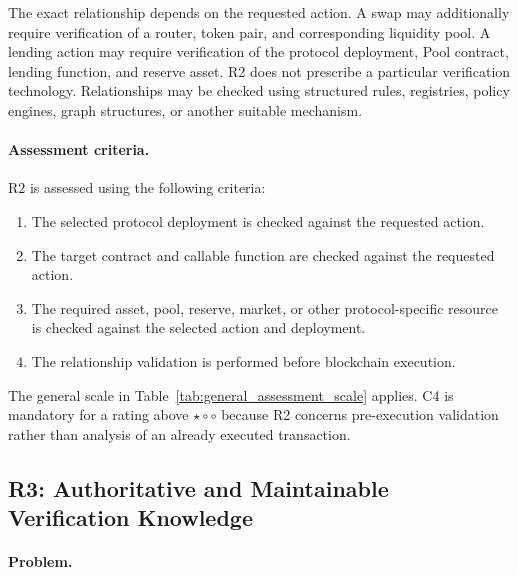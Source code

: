 The exact relationship depends on the requested action. A swap may additionally
require verification of a router, token pair, and corresponding liquidity pool.
A lending action may require verification of the protocol deployment, Pool
contract, lending function, and reserve asset. R2 does not prescribe a particular verification technology. Relationships may
be checked using structured rules, registries, policy engines, graph structures,
or another suitable mechanism.

\paragraph{Assessment criteria.}

R2 is assessed using the following criteria:

\begin{enumerate}
    \item[\textbf{C1}] The selected protocol deployment is checked against
    the requested action.

    \item[\textbf{C2}] The target contract and callable function are checked
    against the requested action.

    \item[\textbf{C3}] The required asset, pool, reserve, market, or other
    protocol-specific resource is checked against the selected action and
    deployment.

    \item[\textbf{C4}] The relationship validation is performed before
    blockchain execution.
\end{enumerate}



The general scale in Table~\ref{tab:general_assessment_scale} applies.
C4 is mandatory for a rating above $\star\circ\circ$ because R2 concerns
pre-execution validation rather than analysis of an already executed transaction.


\subsection{R3: Authoritative and Maintainable Verification Knowledge}
\label{subsec:r3_verification_knowledge}

\paragraph{Problem.}

